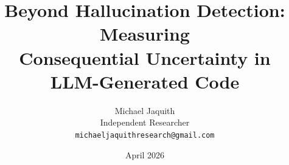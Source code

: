 \documentclass[11pt]{article}
\title{Beyond Hallucination Detection: Measuring\\
       Consequential Uncertainty in LLM-Generated Code}
\author{Michael Jaquith\\
        Independent Researcher\\
        \texttt{michaeljaquithresearch@gmail.com}}
\date{April 2026}
\begin{document}
\maketitle

\begin{abstract}

\end{abstract}











\end{document}
